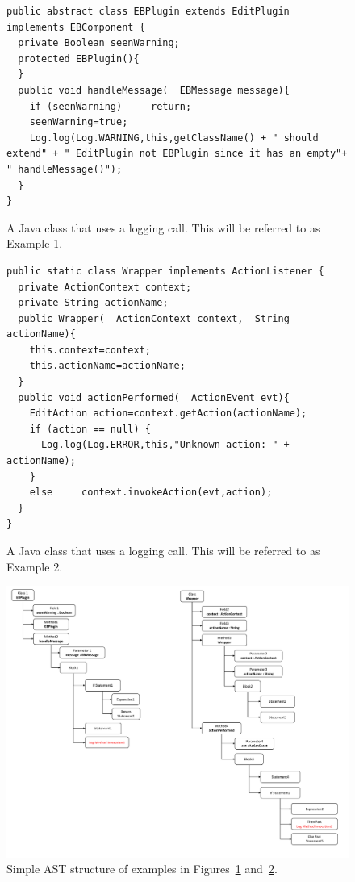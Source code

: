 
\begin{figure}[H]
\def\baselinestretch{1}
\begin{lstlisting}
public abstract class EBPlugin extends EditPlugin implements EBComponent {
  private Boolean seenWarning;
  protected EBPlugin(){
  }
  public void handleMessage(  EBMessage message){
    if (seenWarning)     return;
    seenWarning=true;
    Log.log(Log.WARNING,this,getClassName() + " should extend" + " EditPlugin not EBPlugin since it has an empty"+ " handleMessage()");
  }
}
\end{lstlisting}
\caption{A Java class that uses a logging call. This will be referred to as Example 1.\label{ch3-ex1}}
\end{figure}


\begin{figure}[H]
\def\baselinestretch{1}
\begin{lstlisting}
public static class Wrapper implements ActionListener {
  private ActionContext context;
  private String actionName;
  public Wrapper(  ActionContext context,  String actionName){
    this.context=context;
    this.actionName=actionName;
  }
  public void actionPerformed(  ActionEvent evt){
    EditAction action=context.getAction(actionName);
    if (action == null) {
      Log.log(Log.ERROR,this,"Unknown action: " + actionName);
    }
    else     context.invokeAction(evt,action);
  }
}
\end{lstlisting}
\caption{A Java class that uses a logging call. This will be referred to as Example 2.\label{ch3-ex2}}
\end{figure}

\begin{figure} [H]
  \centering\includegraphics [width = \textwidth]{Drawing4/AST.pdf}
  \caption{Simple AST structure of examples in Figures~\ref{ch3-ex1} and~\ref{ch3-ex2}.}
  \label{fig:ast}
\end{figure}

